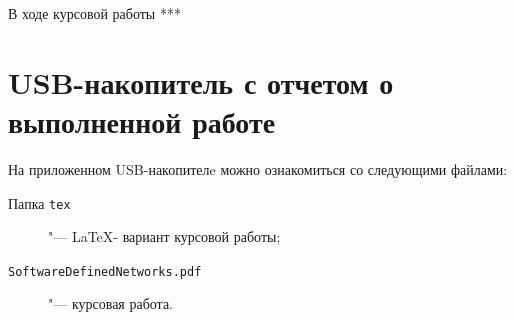 \documentclass[bachelor, och, coursework]{SCWorks}
\begin{document}
\conclusion
В ходе курсовой работы *** 





\appendix
\section{USB-накопитель с отчетом о выполненной работе}\label{app:USB}
На приложенном USB-накопителe можно ознакомиться со следующими файлами:
\begin{description}
\item[Папка \texttt{tex}] "--- \LaTeX- вариант курсовой работы;
\item[\texttt{SoftwareDefinedNetworks.pdf}] "--- курсовая работа.
\end{description}
\end{document}

